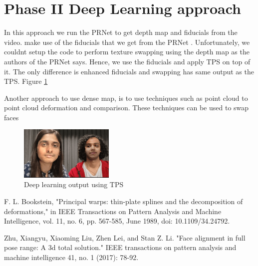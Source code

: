 \documentclass[conference]{IEEEtran}
\begin{document}
\section{Phase II Deep Learning approach}
In this approach we run the PRNet \cite{deep_learning} to get depth map and fiducials from the video. make use of the fiducials that we get from the PRNet \cite{deep_learning}. Unfortunately, we couldnt setup the code to perform texture swapping using the depth map as the authors of the PRNet says. Hence, we use the fiducials and apply TPS on top of it. The only difference is enhanced fiducials and swapping has same output as the TPS. Figure \ref{fig:dl_output_place_holder}

Another approach to use dense map, is to use techniques such as point cloud to point cloud deformation and comparison. These techniques can be used to swap faces

\begin{figure}[]
\centering
\includegraphics[width=0.4\textwidth]{media/DL_output_ph.png}
\caption{Deep learning output using TPS}
\label{fig:dl_output_place_holder}
\end{figure}


\begin{thebibliography}{00}

F. L. Bookstein, "Principal warps: thin-plate splines and the decomposition of deformations," in IEEE Transactions on Pattern Analysis and Machine Intelligence, vol. 11, no. 6, pp. 567-585, June 1989, doi: 10.1109/34.24792.

 Zhu, Xiangyu, Xiaoming Liu, Zhen Lei, and Stan Z. Li. "Face alignment in full pose range: A 3d total solution." IEEE transactions on pattern analysis and machine intelligence 41, no. 1 (2017): 78-92.

\end{thebibliography}




\end{document}
